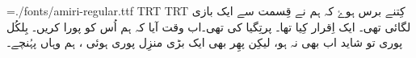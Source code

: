 
\nopagenumbers
\parindent=0mm
\font\amiri={./fonts/amiri-regular.ttf}
\textdir TRT
\pardir TRT
\amiri
کِتنے برس ہوۓ کہ ہم نے قِسمت سے ایک بازی لگائی تھی۔ ایک اِقرار کِیا تھا۔ پرتِگیا کی تھی۔اب وقت آیا کہ ہم اُس کو پورا کریں۔ بِلکُل پوری تو شاید اب بھی نہ ہو، لیکِن پھِر بھی ایک بڑی منزِل پوری ہوئی ، ہم وہاں پہُنچے۔
\bye